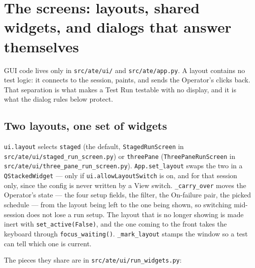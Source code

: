 \chapter{The screens: layouts, shared widgets, and dialogs that answer themselves}\label{ch:ui}

GUI code lives only in \texttt{src/ate/ui/} and \texttt{src/ate/app.py}. A layout contains no test
logic: it connects to the session, paints, and sends the Operator's clicks back. That separation is what
makes a Test Run testable with no display, and it is what the dialog rules below protect.

\section{Two layouts, one set of widgets}

\texttt{ui.layout} selects \texttt{staged} (the default, \texttt{StagedRunScreen} in
\texttt{src/\allowbreak{}ate/\allowbreak{}ui/\allowbreak{}staged\_\allowbreak{}run\_\allowbreak{}screen.py}) or \texttt{threePane} (\texttt{ThreePaneRunScreen} in
\texttt{src/\allowbreak{}ate/\allowbreak{}ui/\allowbreak{}three\_\allowbreak{}pane\_\allowbreak{}run\_\allowbreak{}screen.py}). \texttt{App.set\_layout} swaps the two in a
\texttt{QStackedWidget} --- only if \texttt{ui.allowLayoutSwitch} is on, and for that session only, since
the config is never written by a View switch. \texttt{\_carry\_over} moves the Operator's state --- the
four setup fields, the filter, the On-failure pair, the picked schedule --- from the layout being left to
the one being shown, so switching mid-session does not lose a run setup. The layout that is no longer
showing is made inert with \texttt{set\_active(False)}, and the one coming to the front takes the keyboard
through \texttt{focus\_waiting()}. \texttt{\_mark\_layout} stamps the window so a test can tell which one
is current.

The pieces they share are in \texttt{src/\allowbreak{}ate/\allowbreak{}ui/\allowbreak{}run\_\allowbreak{}widgets.py}:

